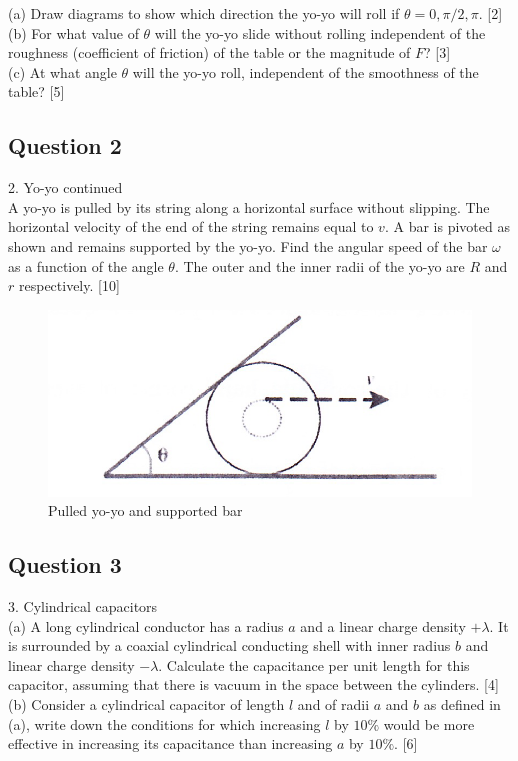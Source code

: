 \documentclass{article}
\begin{document}
(a) Draw diagrams to show which direction the yo-yo will roll if $\theta=0, \pi / 2, \pi .$ [2] \\
(b) For what value of $\theta$ will the yo-yo slide without rolling independent of the roughness (coefficient of friction) of the table or the magnitude of $F$? [3] \\
(c) At what angle $\theta$ will the yo-yo roll, independent of the smoothness of the table? [5]

\subsection{Question 2}
2. Yo-yo continued \\ A yo-yo is pulled by its string along a horizontal surface without slipping. The horizontal velocity of the end of the string remains equal to $v .$ A bar is pivoted as shown and remains supported by the yo-yo. Find the angular speed of the bar $\omega$ as a function of the angle $\theta$. The outer and the inner radii of the yo-yo are $R$ and $r$ respectively. [10]

\begin{figure}
	\centering
	\includegraphics[width=0.5\linewidth]{spho_book_TYS_images/2014q2.png}
	\caption{Pulled yo-yo and supported bar}
\end{figure}

\subsection{Question 3}
3. Cylindrical capacitors \\
(a) A long cylindrical conductor has a radius $a$ and a linear charge density $+\lambda$. It is surrounded by a coaxial cylindrical conducting shell with inner radius $b$ and linear charge density $-\lambda .$ Calculate the capacitance per unit length for this capacitor, assuming that there is vacuum in the space between the cylinders. [4] \\
(b) Consider a cylindrical capacitor of length $l$ and of radii $a$ and $b$ as defined in (a), write down the conditions for which increasing $l$ by $10 \%$ would be more effective in increasing its capacitance than increasing $a$ by $10 \%$. [6] 
\end{document}
